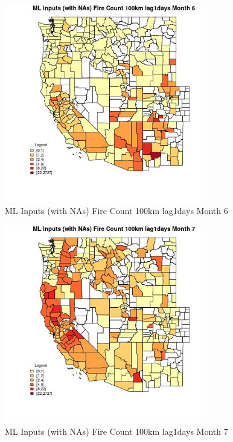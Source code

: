 \begin{figure} 
\centering  
\includegraphics[width=0.77\textwidth]{Code_Outputs/Report_ML_input_PM25_Step4_part_f_de_duplicated_aveswNAs_CountyFire_Count_100km_lag1daysmedianMonth6.jpg} 
\caption{\label{fig:Report_ML_input_PM25_Step4_part_f_de_duplicated_aveswNAsCountyFire_Count_100km_lag1daysmedianMonth6}ML Inputs (with NAs) Fire Count 100km lag1days Month 6} 
\end{figure} 
 

\begin{figure} 
\centering  
\includegraphics[width=0.77\textwidth]{Code_Outputs/Report_ML_input_PM25_Step4_part_f_de_duplicated_aveswNAs_CountyFire_Count_100km_lag1daysmedianMonth7.jpg} 
\caption{\label{fig:Report_ML_input_PM25_Step4_part_f_de_duplicated_aveswNAsCountyFire_Count_100km_lag1daysmedianMonth7}ML Inputs (with NAs) Fire Count 100km lag1days Month 7} 
\end{figure} 
 

